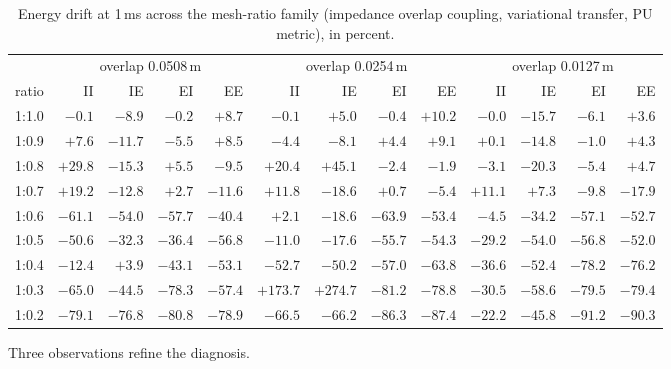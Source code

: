 \documentclass[11pt]{article}
\begin{document}
\begin{table}[htbp]
\centering
\small\setlength{\tabcolsep}{3.6pt}
\caption{Energy drift at 1\,ms across the mesh-ratio family (impedance
overlap coupling, variational transfer, PU metric), in percent.}
\label{tab:ratio-sweep}
\begin{tabular}{l rrrr rrrr rrrr}
\toprule
& \multicolumn{4}{c}{overlap 0.0508\,m} & \multicolumn{4}{c}{overlap 0.0254\,m}
& \multicolumn{4}{c}{overlap 0.0127\,m} \\
\cmidrule(lr){2-5}\cmidrule(lr){6-9}\cmidrule(lr){10-13}
ratio & II & IE & EI & EE & II & IE & EI & EE & II & IE & EI & EE \\
\midrule
1:1.0 & $-0.1$ & $-8.9$ & $-0.2$ & $+8.7$ & $-0.1$ & $+5.0$ & $-0.4$ & $+10.2$ & $-0.0$ & $-15.7$ & $-6.1$ & $+3.6$ \\
1:0.9 & $+7.6$ & $-11.7$ & $-5.5$ & $+8.5$ & $-4.4$ & $-8.1$ & $+4.4$ & $+9.1$ & $+0.1$ & $-14.8$ & $-1.0$ & $+4.3$ \\
1:0.8 & $\mathbf{+29.8}$ & $-15.3$ & $+5.5$ & $-9.5$ & $+20.4$ & $\mathbf{+45.1}$ & $-2.4$ & $-1.9$ & $-3.1$ & $-20.3$ & $-5.4$ & $+4.7$ \\
1:0.7 & $+19.2$ & $-12.8$ & $+2.7$ & $-11.6$ & $+11.8$ & $-18.6$ & $+0.7$ & $-5.4$ & $+11.1$ & $+7.3$ & $-9.8$ & $-17.9$ \\
1:0.6 & $-61.1$ & $-54.0$ & $-57.7$ & $-40.4$ & $+2.1$ & $-18.6$ & $-63.9$ & $-53.4$ & $-4.5$ & $-34.2$ & $-57.1$ & $-52.7$ \\
1:0.5 & $-50.6$ & $-32.3$ & $-36.4$ & $-56.8$ & $-11.0$ & $-17.6$ & $-55.7$ & $-54.3$ & $-29.2$ & $-54.0$ & $-56.8$ & $-52.0$ \\
1:0.4 & $-12.4$ & $+3.9$ & $-43.1$ & $-53.1$ & $-52.7$ & $-50.2$ & $-57.0$ & $-63.8$ & $-36.6$ & $-52.4$ & $-78.2$ & $-76.2$ \\
1:0.3 & $-65.0$ & $-44.5$ & $-78.3$ & $-57.4$ & $\mathbf{+173.7}$ & $\mathbf{+274.7}$ & $-81.2$ & $-78.8$ & $-30.5$ & $-58.6$ & $-79.5$ & $-79.4$ \\
1:0.2 & $-79.1$ & $-76.8$ & $-80.8$ & $-78.9$ & $-66.5$ & $-66.2$ & $-86.3$ & $-87.4$ & $-22.2$ & $-45.8$ & $-91.2$ & $-90.3$ \\
\bottomrule
\end{tabular}
\end{table}

Three observations refine the diagnosis.
\end{document}
